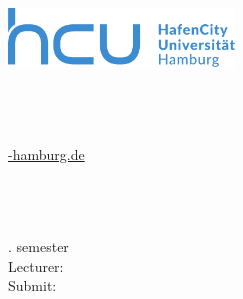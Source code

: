 \begin{titlepage}
	\thispagestyle{empty}
	
	\begin{minipage}[t]{0.4\textwidth}
		\vspace{0pt}
		\includegraphics[width=60mm]{Data/hcu_logo.pdf}
	\end{minipage}
	\hfill
	\begin{minipage}[t]{0.5\textwidth}
		\vspace{0pt}
		\begin{flushright}
			\Writer\\
			\Register\\
			\Module\\
			\href{mailto:\Mail@hcu-hamburg.de}{\Mail@hcu-hamburg.de} \\
		\end{flushright}
	\end{minipage}
	
	\vspace{150pt}
	
	\begin {center}
	\Large \Type
	\end {center}
	\begin {center}
	\huge \Title
	\end {center}
	
	\vfill
	
	\begin{flushleft}
		\Event\\
		\Semester \\
		\Study\\
		\SubjectSemester. semester\\
		\vspace{10pt}
		Lecturer: \\ 
		\Lecturer
		\vspace{30pt}
		Submit: \dateofsubmission
	\end{flushleft}
	
\end{titlepage}